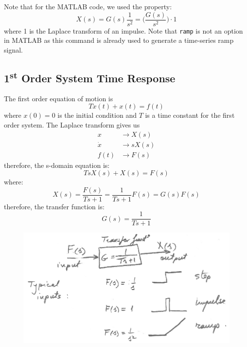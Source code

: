 \documentclass[12pt,letter]{article}
\numberwithin{ex}{section} %
\numberwithin{re}{section} %
\numberwithin{equation}{section}	%
\begin{document}
Note that for the MATLAB code, we used the property:
\begin{equation}
X(s) = G(s) \frac{1}{s^2} = \Big(\frac{G(s)}{s^2}\Big) \cdot 1
\end{equation}
where 1 is the Laplace transform of an impulse. Note that \texttt{ramp} is not an option in MATLAB as this command is already used to generate a time-series ramp signal. 


\subsection{1\textsuperscript{st} Order System Time Response}

The first order equation of motion is
\begin{equation}
T \dot{x}(t) + x(t) = f(t)
\end{equation}
where $x(0)=0$ is the initial condition and $T$ is a time constant for the first order system. The Laplace transform gives us
\begin{align}
x & \rightarrow X(s) \\
\dot{x} & \rightarrow sX(s) \nonumber \\
f(t) & \rightarrow F(s) \nonumber 
\end{align}
therefore, the s-domain equation is:
\begin{equation}
TsX(s) + X(s) = F(s)
\end{equation}
where:
\begin{equation}
X(s) = \frac{F(s)}{T s + 1} = \frac{1}{Ts + 1}F(s) = G(s)F(s)
\end{equation}
therefore, the transfer function is:
\begin{equation}
G(s) = \frac{1}{T s + 1}
\end{equation}

\begin{figure}[H]
	\centering
	\includegraphics[width=5.5in]{../figures/time_response_1st_order}
\end{figure}
\end{document}
